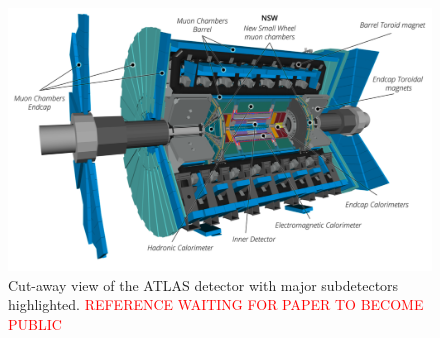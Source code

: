 	\begin{figure}[!ht]
	\centering
	\includegraphics[width=.75\textwidth,keepaspectratio=true]{chapters/chapter3_experiment/images/ATLAS_3d_run3.png}
	\caption{ Cut-away view of the \gls{ATLAS} detector with major subdetectors highlighted. \textcolor{red}{REFERENCE WAITING FOR PAPER TO BECOME PUBLIC}}
	\label{fig:ATLAS}
	\end{figure}



